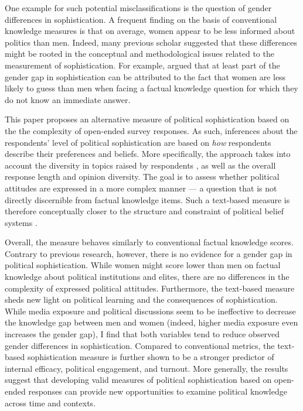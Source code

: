 \documentclass[12pt]{article}
\begin{document}
One example for such potential misclassifications is the question of gender differences in sophistication. A frequent finding on the basis of conventional knowledge measures is that on average, women appear to be less informed about politics than men. Indeed, many previous scholar suggested that these differences might be rooted in the conceptual and methodological issues related to the measurement of sophistication. For example, \citet{mondak2004knowledge} argued that at least part of the gender gap in sophistication can be attributed to the fact that women are less likely to guess than men when facing a factual knowledge question for which they do not know an immediate answer.

This paper proposes an alternative measure of political sophistication based on the the complexity of open-ended survey responses. As such, inferences about the respondents' level of political sophistication are based on \textsl{how} respondents describe their preferences and beliefs. More specifically, the approach takes into account the diversity in topics raised by respondents \citep[measured using structural topic models, c.f.,][]{roberts2014structural}, as well as the overall response length and opinion diversity. The goal is to assess whether political attitudes are expressed in a more complex manner --- a question that is not directly discernible from factual knowledge items. Such a text-based measure is therefore conceptually closer to the structure and constraint of political belief systems 
\citep[see for example][]{tetlock1983cognitive,luskin1987measuring}. 

Overall, the measure behaves similarly to conventional factual knowledge scores. Contrary to previous research, however, there is no evidence for a gender gap in political sophistication. While women might score lower than men on factual knowledge about political institutions and elites, there are no differences in the complexity of expressed political attitudes. Furthermore, the text-based measure sheds new light on political learning and the consequences of sophistication. While media exposure and political discussions seem to be ineffective to decrease the knowledge gap between men and women (indeed, higher media exposure even increases the gender gap), I find that both variables tend to reduce observed gender differences in sophistication. Compared to conventional metrics, the text-based sophistication measure is further shown to be a stronger predictor of internal efficacy, political engagement, and turnout. More generally, the results suggest that developing valid measures of political sophistication based on open-ended responses can provide new opportunities to examine political knowledge across time and contexts. 
\end{document}
